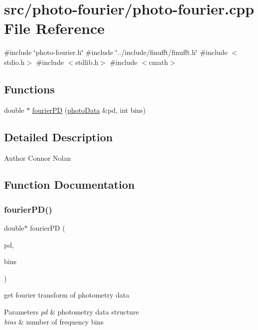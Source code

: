 \hypertarget{photo-fourier_8cpp}{}\section{src/photo-\/fourier/photo-\/fourier.cpp File Reference}
\label{photo-fourier_8cpp}
{\ttfamily \#include \char`\"{}photo-\/fourier.\+h\char`\"{}}\newline
{\ttfamily \#include \char`\"{}../include/finufft/finufft.\+h\char`\"{}}\newline
{\ttfamily \#include $<$stdio.\+h$>$}\newline
{\ttfamily \#include $<$stdlib.\+h$>$}\newline
{\ttfamily \#include $<$cmath$>$}\newline
\subsection*{Functions}
\begin{DoxyCompactItemize}
\item 
double $\ast$ \mbox{\hyperlink{photo-fourier_8cpp_a6409c48ec831f9c42e890054e1a620a2}{fourier\+PD}} (\mbox{\hyperlink{structphotoData}{photo\+Data}} \&pd, int bins)
\end{DoxyCompactItemize}


\subsection{Detailed Description}
\begin{DoxyAuthor}{Author}
Connor Nolan 
\end{DoxyAuthor}


\subsection{Function Documentation}
\mbox{\label{photo-fourier_8cpp_a6409c48ec831f9c42e890054e1a620a2}} 
\subsubsection{\texorpdfstring{fourier\+P\+D()}{fourierPD()}}
{\footnotesize\ttfamily double$\ast$ fourier\+PD (\begin{DoxyParamCaption}\item[{\mbox{\hyperlink{structphotoData}{photo\+Data}} \&}]{pd,  }\item[{int}]{bins }\end{DoxyParamCaption})}

get fourier transform of photometry data


\begin{DoxyParams}{Parameters}
{\em pd} & photometry data structure \\
\hline
{\em bins} & number of frequency bins \\
\hline
\end{DoxyParams}

